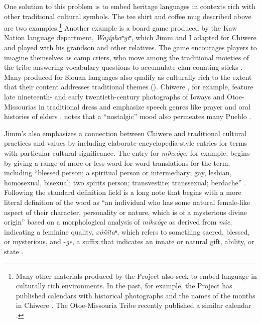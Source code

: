 \documentclass[output=paper]{LSP/langsci}
\begin{document}
One solution to this problem is to embed heritage languages in contexts rich with other traditional cultural symbols. The tee shirt and coffee mug described above are two examples.\footnote{Many other materials produced by the Project also seek to embed language in culturally rich environments. In the past, for example, the Project has published calendars with historical photographs and the names of the months in Chiwere \citep{Goodtracks1985}. The Otoe-Missouria Tribe recently published a similar calendar \citep{OtoeMissouriaLD2014}.}  Another example is a board game produced by the Kaw Nation language department, \emph{Wajíphaⁿyiⁿ}, which Jimm and I adapted for Chiwere and played with his grandson and other relatives. The game encourages players to imagine themselves as camp criers, who move among the traditional moieties of the tribe answering vocabulary questions to accumulate clan counting sticks \citep{KanzaLP2004}. Many  produced for Siouan languages also qualify as culturally rich to the extent that their content addresses traditional themes (\citealt[e.g.][]{HartmannMarschke2010, KanzaLP2010}). Chiwere , for example, feature late nineteenth- and early twentieth-century photographs of Ioways and Otoe-Missourias in traditional dress and emphasize speech genres like prayer and oral histories of elders \citep{OtoeIowaWistrandRobinson1977, OtoeIowaWistrandRobinson1978}.  notes that a ``nostalgic'' mood also permeates many Pueblo .

Jimm's  also emphasizes a connection between Chiwere and traditional cultural practices and values by including elaborate encyclopedia-style entries for terms with particular cultural significance. The entry for \emph{mihxóge}, for example, begins by giving a range of more or less word-for-word  translations for the term, including ``blessed person; a spiritual person or intermediary; gay, lesbian, homosexual, bisexual; two spirits person; transvestite; transsexual; berdache'' \citep[6]{Goodtracks2008}. Following the standard definition field is a long note that begins with a more literal definition of the word as ``an individual who has some natural female-like aspect of their character, personality or nature, which is of a mysterious divine origin'' based on a morphological analysis of \emph{mihxóge} as derived from \emph{mie}, indicating a feminine quality, \emph{xóñitaⁿ}, which refers to something sacred, blessed, or mysterious, and -\emph{ge}, a suffix that indicates an innate or natural gift, ability, or state \citep[6]{Goodtracks2008}.
\end{document}
